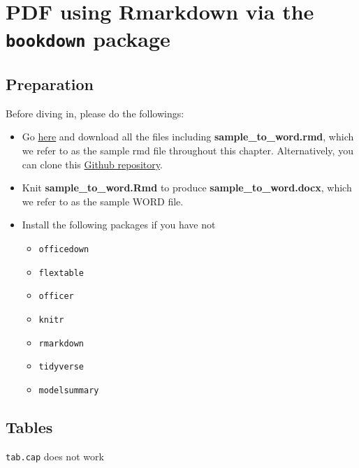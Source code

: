 \documentclass[
  letterpaper,
  DIV=11,
  numbers=noendperiod]{scrreprt}
\providecommand{\tightlist}{%
  \setlength{\itemsep}{0pt}\setlength{\parskip}{0pt}}\usepackage{longtable,booktabs,array}
\begin{document}

\hypertarget{sec-rmarkdown-pdf}{%
\chapter{\texorpdfstring{PDF using Rmarkdown via the \texttt{bookdown}
package}{PDF using Rmarkdown via the bookdown package}}\label{sec-rmarkdown-pdf}}

\hypertarget{preparation-1}{%
\section{Preparation}\label{preparation-1}}

Before diving in, please do the followings:

\begin{itemize}
\item
  Go
  \href{https://www.dropbox.com/sh/l95j7vk8sxl2nnu/AAAwWMl8yO6Vbj0u_9zd_fv6a?dl=0}{here}
  and download all the files including \textbf{sample\_to\_word.rmd},
  which we refer to as the sample rmd file throughout this chapter.
  Alternatively, you can clone this
  \href{https://github.com/tmieno2/WritingJournalArticleRmarkdown}{Github
  repository}.
\item
  Knit \textbf{sample\_to\_word.Rmd} to produce
  \textbf{sample\_to\_word.docx}, which we refer to as the sample WORD
  file.
\item
  Install the following packages if you have not

  \begin{itemize}
  \tightlist
  \item
    \texttt{officedown}
  \item
    \texttt{flextable}
  \item
    \texttt{officer}
  \item
    \texttt{knitr}
  \item
    \texttt{rmarkdown}
  \item
    \texttt{tidyverse}
  \item
    \texttt{modelsummary}
  \end{itemize}
\end{itemize}

\hypertarget{tables}{%
\section{Tables}\label{tables}}

\texttt{tab.cap} does not work
\end{document}

